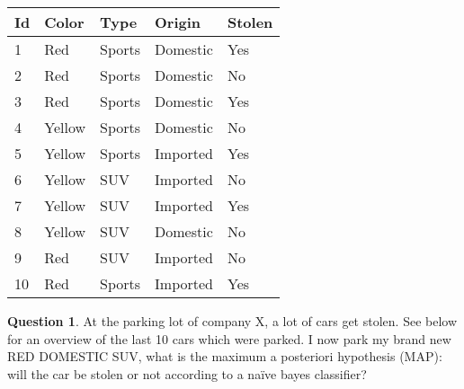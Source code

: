 \documentclass[11pt,a4paper]{article}
\theoremstyle{definition}%
\newtheorem{Q}{Question}[] %
\begin{document}
\begin{center}
\begin{tabular}{|l|l|l|l|l|}
\hline
\textbf{Id} & \textbf{Color} & \textbf{Type} & \textbf{Origin} & \textbf{Stolen} \\ \hline
1           & Red            & Sports        & Domestic        & Yes             \\ \hline
2           & Red            & Sports        & Domestic        & No              \\ \hline
3           & Red            & Sports        & Domestic        & Yes             \\ \hline
4           & Yellow         & Sports        & Domestic        & No              \\ \hline
5           & Yellow         & Sports        & Imported        & Yes             \\ \hline
6           & Yellow         & SUV           & Imported        & No              \\ \hline
7           & Yellow         & SUV           & Imported        & Yes             \\ \hline
8           & Yellow         & SUV           & Domestic        & No              \\ \hline
9           & Red            & SUV           & Imported        & No              \\ \hline
10          & Red            & Sports        & Imported        & Yes             \\ \hline
\end{tabular}
\end{center}

\begin{Q}
    At the parking lot of company X, a lot of cars get stolen. See below for an overview of the last 10
cars which were parked. I now park my brand new RED DOMESTIC SUV, what is the maximum
a posteriori hypothesis (MAP): will the car be stolen or not according to a na\"ive bayes classifier?

\end{Q}
\end{document}
